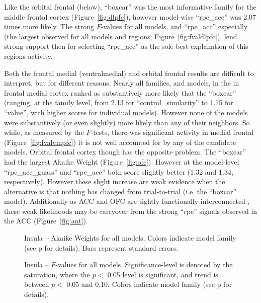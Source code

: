 \documentclass[doc,12pt]{apa}        %
\begin{document}
Like the orbital frontal (below), ``boxcar'' was the most informative family for the middle frontal cortex (Figure~\ref{fig:dlpfc}), however model-wise ``rpe\_acc'' was 2.07 times more likely.  The strong $F$-values for all models, and ``rpe\_acc'' especially (the largest observed for all models and regions; Figure~\ref{fig:fvaldlpfc}), lend strong support then for selecting ``rpe\_acc'' as the sole best explanation of this regions activity.

Both the frontal medial (ventralmedial) and orbital frontal results are difficult to interpret, but for different reasons.  Nearly all families, and models, in the in frontal medial cortex ranked as substantively more likely that the ``boxcar'' (ranging, at the family level, from 2.13 for ``control\_similarity'' to 1.75 for ``value'', with higher scores for individual models).  However none of the models were substantively (or even slightly) more likely than any of their neighbors.  So while, as measured by the $F$-tests, there was significant activity in medial frontal (Figure~\ref{fig:fvalvmpfc}) it is not well accounted for by any of the candidate models.  Orbital frontal cortex though has the opposite problem.  The ``boxcar'' had the largest Akaike Weight (Figure~\ref{fig:ofc}).  However at the model-level ``rpe\_acc\_guass'' and ``rpe\_acc'' both score slightly better (1.32 and 1.34, respectively).  However these slight increase are weak evidence when the alternative is that nothing has changed from trial-to-trial (i.e. the ``boxcar'' model).  Additionally as ACC and OFC are tightly functionally interconnected \cite{Rudebeck:2008p4712}, these weak likelihoods may be carryover from the strong ``rpe'' signals observed in the ACC (Figure~\ref{fig:ant}).

\begin{figure}[tp]
    \centering
    \caption{Insula -- Akaike Weights for all models.  Colors indicate model family (see p\pageref{sub:cmb} for details). Bars represent standard errors.}
	\label{fig:insula}
\end{figure}
\begin{figure}[tp]
    \centering
    \caption{Insula -- $F$-values for all models.
    Significance-level is denoted by the saturation, where the $p <$ 0.05 level is
    significant, and trend is between $p <$ 0.05 and 0.10.  Colors indicate model family (see p\pageref{sub:cmb} for details).}
	\label{fig:fvalinsula}
\end{figure}
\end{document}
